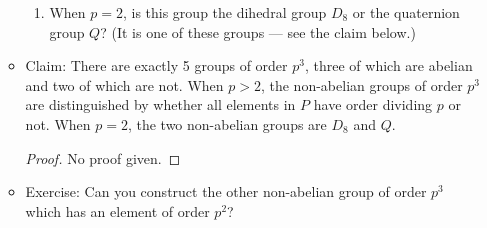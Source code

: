 \documentclass[../notes.tex]{subfiles}
\begin{document}
\begin{itemize}
\begin{itemize}
\begin{enumerate}
            \item When $p=2$, is this group the dihedral group $D_8$ or the quaternion group $Q$? (It is one of these groups --- see the claim below.)
        \end{enumerate}
        \item Claim: There are exactly 5 groups of order $p^3$, three of which are abelian and two of which are not. When $p>2$, the non-abelian groups of order $p^3$ are distinguished by whether all elements in $P$ have order dividing $p$ or not. When $p=2$, the two non-abelian groups are $D_8$ and $Q$.
        \begin{proof}
            No proof given.
        \end{proof}
        \item Exercise: Can you construct the other non-abelian group of order $p^3$ which has an element of order $p^2$?
    \end{itemize}
\end{itemize}
\end{document}
